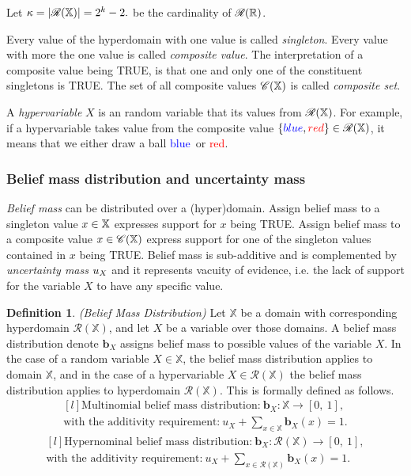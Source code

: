 \documentclass[a4paper,12pt]{article}
\theoremstyle{definition}
\newtheorem{definition}{Definition}[section]
\numberwithin{equation}{section}
\newcommand{\red}{\textcolor{red}{red}}
\newcommand{\blue}{\textcolor{blue}{blue}}
\begin{document}
Let $\kappa = |\mathcal{R}(\mathbb{X})| = 2^k -2\text{.}$ be the cardinality of $\mathcal{R}(\mathbb{R})$.

Every value of the hyperdomain with one value is called \emph{singleton}. Every value with more the one value is called \emph{composite value}. The interpretation of a composite value being TRUE, is that one and only one of the constituent singletons is TRUE. The set of all composite values $\mathcal{C}(\mathbb{X})$ is called \emph{composite set}.

A \emph{hypervariable} $X$ is an random variable that its values from $\mathcal{R}(\mathbb{X})$. For example, if a hypervariable takes value from the composite value $\{\blue, \red\} \in \hdom{X}$, it means that we either draw a ball \blue\ or \red.

\subsubsection{Belief mass distribution and uncertainty mass}

\emph{Belief mass} can be distributed over a (hyper)domain. Assign belief mass to a singleton value $x \in \mathbb{X}$ expresses support for $x$ being TRUE. Assign belief mass to a composite value $x \in \mathcal{C}(\mathbb{X})$ express support for one of the singleton values contained in $x$ being TRUE. Belief mass is sub-additive and is complemented by \emph{uncertainty mass} $u_{X}$ and it represents
vacuity of evidence, i.e. the lack of support for the variable $X$ to have any specific value.

\begin{definition}
	\emph{(Belief Mass Distribution)} Let $\mathbb{X}$ be a domain with corresponding hyperdomain $\mathcal{R}(\mathbb{X})$, and let $X$ be a variable over those domains. A belief mass distribution denote $\mathbf{b}_X$ assigns belief mass to possible values of the variable $X$. In the case of a random variable $X \in \mathbb{X}$, the belief mass distribution applies to domain $\mathbb{X}$, and in the case of a hypervariable $X \in \mathcal{R}(\mathbb{X})$ the belief mass distribution applies to hyperdomain $\mathcal{R}(\mathbb{X})$. This is formally defined as follows.
	\begin{equation}\label{eq:multinomial-belief-mass-dristribution}
		\begin{matrix*}[l]
			\text{Multinomial belief mass distribution:}\ \mathbf{b}_X : \mathbb{X} \rightarrow [0,\ 1], \\
			\text{with the additivity requirement:}\ u_X + \sum\limits_{x \in \mathbb{X}} \mathbf{b}_X(x) = 1\text{.}
		\end{matrix*}
	\end{equation}
	\begin{equation}\label{eq:hypernomal_belief_mass_distribution}
		\begin{matrix*}[l]
			\text{Hypernominal belief mass distribution:}\ \mathbf{b}_X : \mathcal{R}(\mathbb{X}) \rightarrow [0,\ 1], \\
			\text{with the additivity requirement:}\ u_X + \sum\limits_{x \in \mathcal{R}(\mathbb{X})} \mathbf{b}_X(x) = 1\text{.}
		\end{matrix*}
	\end{equation}
\end{definition}
\end{document}
